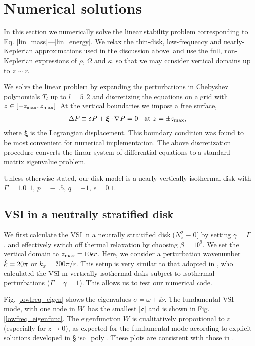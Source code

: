 \section{Numerical solutions}
In this section we numerically solve the linear stability problem
corresponding to Eq. \ref{lin_mass}---\ref{lin_energy}. 
We relax the thin-disk, low-frequency and nearly-Keplerian
approximations used in the discussion above, and 
use the full, non-Keplerian expressions of $\rho$, $\Omega$ and
$\kappa$, so that we may consider vertical domains up to $z\sim r$.  

We solve the linear problem by expanding the
perturbations in Chebyshev polynomials $T_l$ up to $l=512$
and discretizing the equations on a grid with
$z\in[-z_\mathrm{max},z_\mathrm{max}]$. At the vertical boundaries we impose a free
surface, 
\begin{align}
  \Delta P \equiv \delta P + \bm{\xi}\cdot\nabla P= 0 \quad \text{at } z=\pm z_\mathrm{max},
\end{align}
where $\bm{\xi}$ is the Lagrangian displacement. This boundary
condition was found to be most convenient for numerical
implementation. The above discretization procedure converts the linear  
system of differential equations to a standard matrix eigenvalue
problem.     

Unless otherwise stated, our disk model is a nearly-vertically
isothermal disk with $\Gamma=1.011$, $p=-1.5$, $q=-1$,
$\epsilon=0.1$. 


\subsection{VSI in a neutrally stratified disk}\label{vertiso_pertiso} 
We first calculate the VSI in a neutrally straitified disk ($N_z^2\equiv0$) by setting
$\gamma=\Gamma$, and effectively switch off thermal relaxation by
choosing $\beta=10^9$. We set the vertical domain to $z_\mathrm{max} =
10\epsilon r$.  Here, we consider a perturbation wavenumber
$\hat{k}=20\pi$ or $k_x = 200\pi/r$. This setup is very similar to that
adopted in \cite{mcnally14}, who calculated the VSI in vertically
isothermal disks subject to isothermal perturbations
($\Gamma=\gamma=1$).  This allows us to test our numerical code. 

Fig. \ref{lowfreq_eigen} shows the eigenvalues $\sigma = \omega +
\ii\nu$. The fundamental VSI mode, with one node in $W$, has
the smallest $|\sigma|$ and is shown in Fig. \ref{lowfreq_eigenfunc}. 
The eigenfunction $W$ is qualitatively proportional to 
$z$ (especially for $z\to0$),  as expected for the fundamental mode
according to explicit solutions developed in \S\ref{iso_poly}.    
These plots are consistent with those in \cite{mcnally14}.  
 
